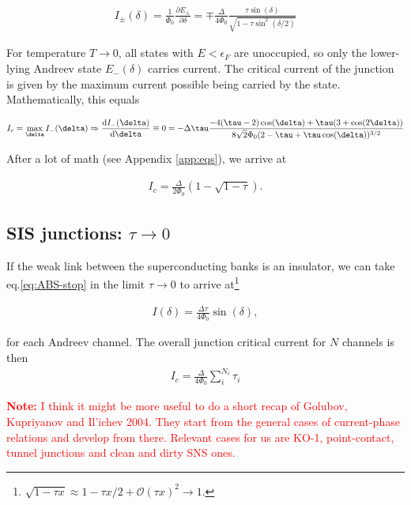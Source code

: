 \begin{eqnarray}
I_{\pm}(\delta)=\frac{1}{\Phi_0}\frac{\partial E_{\pm}}{\partial\delta}=\mp\frac{\Delta}{4\Phi_0}\frac{\tau\sin(\delta)}{\sqrt{1-\tau\sin^2(\delta/2)}}
\label{eq:CPR-full}
\end{eqnarray}

For temperature $T\rightarrow0$, all states with $E<\epsilon_F$ are unoccupied, so only the lower-lying Andreev state $E_{-}(\delta)$ carries current.
The critical current of the junction is given by the maximum current possible being carried by the state. Mathematically, this equals

\begin{eqnarray}
I_c=\max_\delta I_{-}(\delta) \Rightarrow \frac{{\rm d}I_{-}(\delta)}{{\rm d}\delta}\equiv0=-\Delta\tau\frac{-4(\tau-2)\cos(\delta)+\tau(3+\cos(2\delta))}{8\sqrt{2}\Phi_0(2-\tau+\tau\cos(\delta))^{3/2}}
\label{eq:ABS-start}
\end{eqnarray}

After a lot of math (see Appendix \ref{app:eqs}), we arrive at

\begin{eqnarray}
I_c = \frac{\Delta}{2\Phi_0}\left( 1-\sqrt{1-\tau} \right).
\label{eq:ABS-stop}
\end{eqnarray}

\subsection{SIS junctions: $\tau \rightarrow 0$}
If the weak link between the superconducting banks is an insulator, we can take eq.\ref{eq:ABS-stop} in the limit $\tau \rightarrow 0$ to arrive at\footnote{$\sqrt{1-\tau x}\approx 1-\tau x/2+\mathcal{O}(\tau x)^2\rightarrow 1$.}

\begin{eqnarray}
I(\delta)=\frac{\Delta\tau}{4\Phi_0}\sin(\delta),
\end{eqnarray}

for each Andreev channel. The overall junction critical current for $N$ channels is then 
\begin{eqnarray}
	I_c=\frac{\Delta}{4\Phi_0}\sum_{i}^{N_i}\tau_i
\end{eqnarray}

\textcolor{red}{\textbf{Note:} I think it might be more useful to do a short recap of Golubov, Kupriyanov and Il'ichev 2004. 
They start from the general cases of current-phase relations and develop from there.
Relevant cases for us are KO-1, point-contact, tunnel junctions and clean and dirty SNS ones.}


